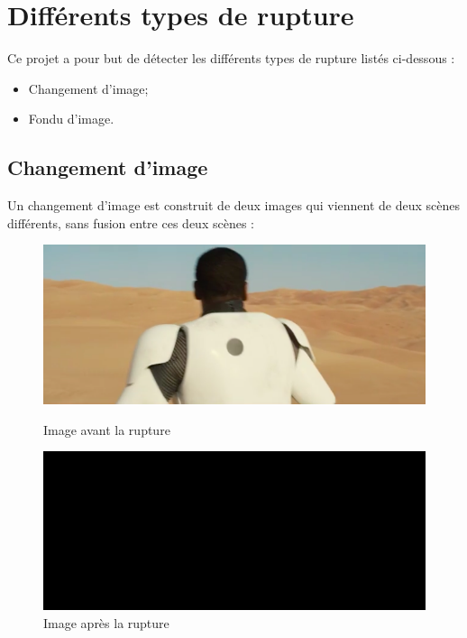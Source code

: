 \section{Différents types de rupture}

Ce projet a pour but de détecter les différents types de rupture listés ci-dessous :

\begin{itemize}
	\item Changement d'image;
	\item Fondu d'image.
\end{itemize}

\subsection{Changement d’image}
Un changement d’image est construit de deux images qui viennent de deux scènes différents, sans fusion entre ces deux scènes :

\begin{figure}[h!]
   \begin{minipage}[c]{.46\linewidth}
	  \centering
      \includegraphics[scale=0.3]{img/rupture1-1.png}
      \caption{\label{Avant} Image avant la rupture}
   \end{minipage} \hfill
   \begin{minipage}[c]{.46\linewidth}
      \centering
      \includegraphics[scale=0.3]{img/rupture1-2.png}
      \caption{\label{Après} Image après la rupture}
   \end{minipage}
\end{figure}


